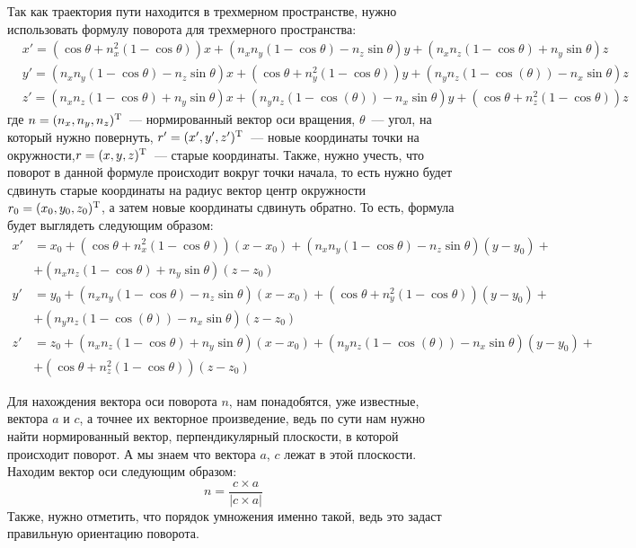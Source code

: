 \documentclass[a4paper,12pt]{article}
\numberwithin{figure}{subsubsection}
\begin{document}
Так как траектория пути находится в трехмерном пространстве, нужно использовать формулу поворота для трехмерного пространства:
\begin{align*}\label{rotation_formula}
        &x' = (\cos{\theta} + n_x^2(1-\cos{\theta}))x + (n_x n_y (1-\cos{\theta}) - n_z\sin{\theta})y + (n_x n_z(1-\cos{\theta}) + n_y \sin{\theta})z \\
        &y' = (n_x n_y (1-\cos{\theta}) - n_z\sin{\theta})x + (\cos{\theta} + n_y^2(1-\cos{\theta}))y + (n_y n_z(1-\cos(\theta)) - n_x\sin{\theta})z\\
        &z' = (n_x n_z(1-\cos{\theta}) + n_y \sin{\theta})x + (n_y n_z(1-\cos(\theta)) - n_x\sin{\theta})y + (\cos{\theta} + n_z^2(1-\cos{\theta}))z
\end{align*}
где $n = (n_x,n_y,n_z)^\text{\textup{T}}$~--- нормированный вектор оси вращения, $\theta$~--- угол, на который нужно повернуть, $r' = (x',y',z')^\text{\textup{T}}$~--- новые координаты точки на окружности,$r=(x,y,z)^\text{\textup{T}}$~--- старые координаты. Также, нужно учесть, что поворот в данной формуле происходит вокруг точки начала, то есть нужно будет сдвинуть старые координаты на радиус вектор центр окружности $r_0=(x_0,y_0,z_0)^\text{\textup{T}}$, а затем новые координаты сдвинуть обратно. То есть, формула будет выглядеть следующим образом:
\begin{align*}
        x' &= x_0 + (\cos{\theta} + n_x^2(1-\cos{\theta}))(x-x_0) + (n_x n_y (1-\cos{\theta}) - n_z\sin{\theta})(y - y_0)+{} \\ 
        & + (n_x n_z(1-\cos{\theta}) + n_y \sin{\theta})(z-z_0) \\
        y' &= y_0 + (n_x n_y (1-\cos{\theta}) - n_z\sin{\theta})(x - x_0) + (\cos{\theta} + n_y^2(1-\cos{\theta}))(y - y_0)+{} \\ 
        &+ (n_y n_z(1-\cos(\theta)) - n_x\sin{\theta})(z - z_0)\\
        z' &= z_0 + (n_x n_z(1-\cos{\theta}) + n_y \sin{\theta})(x - x_0) + (n_y n_z(1-\cos(\theta)) - n_x\sin{\theta})(y-y_0) +{} \\&+ (\cos{\theta} + n_z^2(1-\cos{\theta}))(z - z_0)
\end{align*}

Для нахождения вектора оси поворота $n$, нам понадобятся, уже известные, вектора $a$ и $c$, а точнее их векторное произведение, ведь по сути нам нужно найти нормированный вектор, перпендикулярный плоскости, в которой происходит поворот. А мы знаем что вектора $a$, $c$ лежат в этой плоскости. Находим вектор оси следующим образом:
$$n=\frac{c\times a}{|c\times a|}$$
Также, нужно отметить, что порядок умножения именно такой, ведь это задаст правильную ориентацию поворота.
\end{document}
